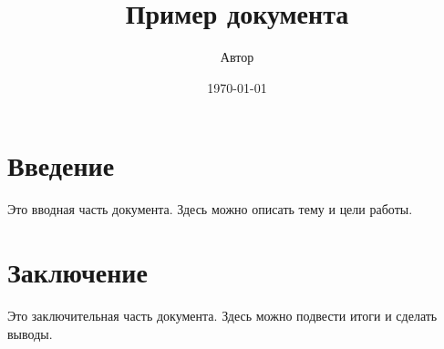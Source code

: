 \documentclass{article}
\title{Пример документа}
\author{Автор}
\date{\today}
\begin{document}
\maketitle

\section{Введение}
Это вводная часть документа. Здесь можно описать тему и цели работы.

\section{Заключение}
Это заключительная часть документа. Здесь можно подвести итоги и сделать выводы.
\end{document}
